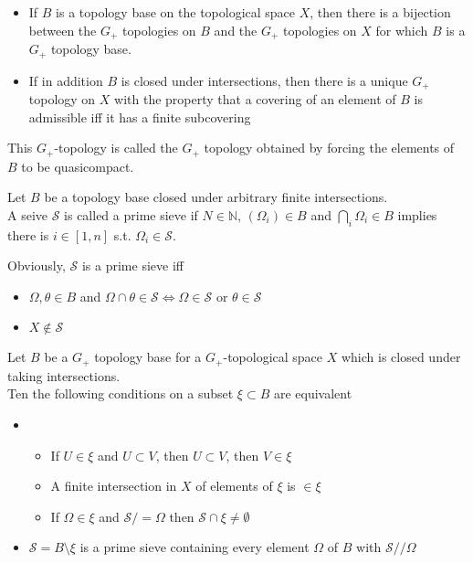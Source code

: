\documentclass[../main.tex]{subfiles}
\begin{document}
\begin{crly}
\begin{itemize}
\item If $B$ is a topology base on the topological space $X$, then there is a bijection between the $G_+$ topologies on $B$ and the $G_+$ topologies on $X$ for which $B$ is a $G_+$ topology base.
\item If in addition $B$ is closed under intersections, then there is a unique $G_+$ topology on $X$ with the property that a covering of an element of $B$ is admissible iff it has a finite subcovering 
\end{itemize}
\end{crly}
\begin{defn}
	This $G_+$-topology is called the $G_+$ topology obtained by forcing the elements of $B$ to be quasicompact.
\end{defn}
\begin{defn}
	Let $B$ be a topology base closed under arbitrary finite intersections.\\
	A seive $ \mathcal{S}$ is called a prime sieve if $N \in \mathbb{N}$, $( \Omega_i) \in B$ and $\bigcap_i \Omega_i \in B$ implies there is $i \in  [ 1,n] $ s.t. $\Omega_i \in \mathcal{S}$.
\end{defn}
\begin{rmq}
Obviously, $\mathcal{S}$ is a prime sieve iff
\begin{itemize}
\item $\Omega,\theta\in B$ and $\Omega\cap\theta \in \mathcal{S}\iff\Omega\in \mathcal{S}$ or $\theta\in \mathcal{S}$ 
\item $X\notin \mathcal{S}$
\end{itemize}
\end{rmq}
\begin{propo}
Let $B$ be a $G_+$ topology base for a $G_+$-topological space $X$ which is closed under taking intersections.\\
Ten the following conditions on a subset $\xi \subset B$ are equivalent
\begin{itemize}
	\item
	\begin{itemize}
\item If $U\in \xi$ and $U \subset V$, then $U \subset V$, then $V \in \xi$ 
\item A finite intersection in $X$ of elements of $\xi$ is $\in \xi$ 
\item If $\Omega \in \xi$ and $ \mathcal{S}/=\Omega$ then $\mathcal{S} \cap \xi \neq \emptyset$ 
	\end{itemize}
\item $ \mathcal{S}= B \setminus \xi$ is a prime sieve containing every element $\Omega$ of $B$ with $ \mathcal{S} / /\Omega$ 
\end{itemize}
\end{propo}
\end{document}
